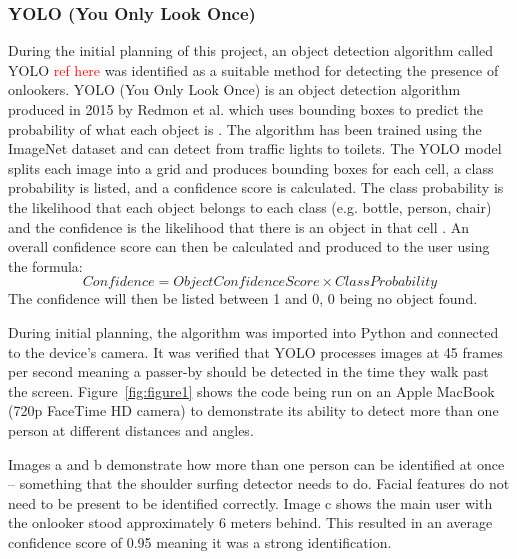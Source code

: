 \documentclass[12pt]{article}
\theoremstyle{plain}
\theoremstyle{definition}
\begin{document}
\subsubsection{YOLO (You Only Look Once)}
During the initial planning of this project, an object detection algorithm called YOLO \textcolor{red}{ref here} was identified as a suitable method for detecting the presence of onlookers.
YOLO (You Only Look Once) is an object detection algorithm produced in 2015 by Redmon et al. which uses bounding boxes to predict the probability of what each object is \cite{redmon_you_2016}. The algorithm has been trained using the ImageNet dataset \cite{noauthor_imagenet_nodate} and can detect from traffic lights to toilets. The YOLO model splits each image into a grid and produces bounding boxes for each cell, a class probability is listed, and a confidence score is calculated. The class probability is the likelihood that each object belongs to each class (e.g. bottle, person, chair) and the confidence is the likelihood that there is an object in that cell \cite{redmon_you_2016}. An overall confidence score can then be calculated and produced to the user using the formula: 
\[
  Confidence = Object Confidence Score \times Class Probability
\]
The confidence will then be listed between 1 and 0, 0 being no object found.

During initial planning, the algorithm was imported into Python and connected to the device’s camera. It was verified that YOLO processes images at 45 frames per second \cite{redmon_you_2016} meaning a passer-by should be detected in the time they walk past the screen. Figure~\ref{fig:figure1} shows the code being run on an Apple MacBook (720p FaceTime HD camera) to demonstrate its ability to detect more than one person at different distances and angles.

Images a and b demonstrate how more than one person can be identified at once – something that the shoulder surfing detector needs to do. Facial features do not need to be present to be identified correctly. Image c shows the main user with the onlooker stood approximately 6 meters behind. This resulted in an average confidence score of 0.95 meaning it was a strong identification.
\end{document}
